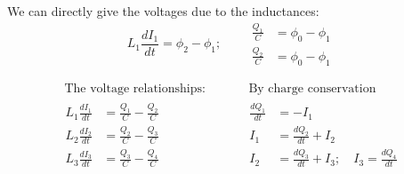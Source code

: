 \documentclass[twoside,10pt]{amsart}
\begin{document}
We can directly give the voltages due to the inductances:
\[
L_1 \frac{dI_1}{dt} = \phi_2 - \phi_1 ; \quad \quad \begin{aligned} \frac{Q_1}{C} & = \phi_0 - \phi_1 \\
  \frac{Q_2}{C} & = \phi_0 - \phi_1 \end{aligned}
\]

\[
\begin{gathered}
\text{ The voltage relationships: } \\
\begin{aligned}
  L_1 \frac{dI_1}{dt} & = \frac{Q_1}{C} - \frac{Q_2}{C} \\
  L_2 \frac{dI_2}{dt} & = \frac{Q_2}{C} - \frac{Q_3}{C} \\
  L_3 \frac{dI_3}{dt} & = \frac{Q_3}{C} - \frac{Q_4}{C} 
\end{aligned}   
\end{gathered} \quad \quad 
\begin{gathered}
  \text{ By charge conservation } \\
  \begin{aligned}
    \frac{dQ_1}{dt} & = -I_1 \\
    I_1 & = \frac{dQ_2}{dt} + I_2 \\
    I_2 & = \frac{dQ_3}{dt} + I_3; \quad I_3 = \frac{dQ_4}{dt}
\end{aligned}
\end{gathered}
\]
\end{document}
